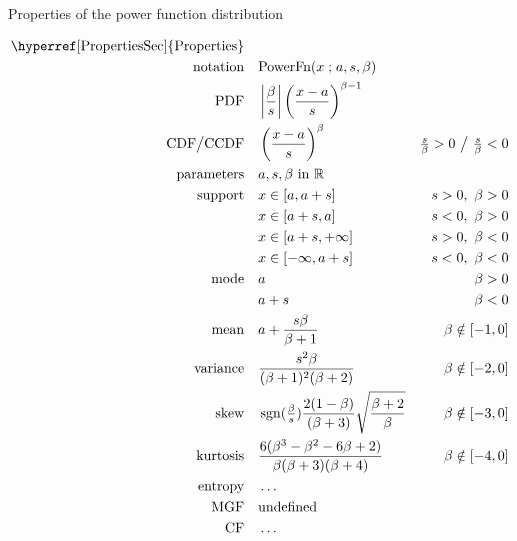 

\begin{table*}[t!]
\caption[Power function distribution -- Properties]{Properties of the power function distribution}
\begin{align*}
\text{\hyperref[PropertiesSec]{Properties}}  \quad& \\
\text{notation}\quad &   \text{PowerFn}(x\given a,s,\beta) 
\\
\text{PDF}\quad &   \left|\frac{\beta}{ s}\right|\left(\frac{x-a}{s} \right)^{\beta -1}  \checked
\\
 \text{CDF}  \big/ \text{CCDF} \quad  &   \left(\frac{x-a}{s} \right)^{\beta } & \tfrac{s}{\beta}  >0 \ \big{/} \ \tfrac{s}{\beta}<0  \checked
\\
\text{parameters}\quad &   a, s, \beta \text{ in } \Real
\\
\text{support} \quad &    x \in [a,a+s] & s>0,\ \beta >0 \checked
 \\ 			 &  x\in[a+s,a] &s<0,\ \beta >0   \checked
 \\  			 &  x\in[a+s,+\infty]& s>0,\ \beta<0 \checked
 \\  			&  x\in[-\infty,a+s] & s<0,\ \beta<0  \checked
\\
\text{mode} \quad  & a & \beta >0 \checked
\\
& a+s & \beta <0  \checked
\\
\text{mean} \quad  &a+  \frac{s\beta}{\beta+1} &  \beta \notin [-1,0] \checked
\\
\text{variance} \quad  & \frac{ s^2 \beta }{ (\beta+1)^2 (\beta+2) } & \beta \notin [-2,0] \checked
\\
\text{skew} \quad  & \op{sgn}(\tfrac{\beta}{s}) \frac{2(1-\beta)}{(\beta+3)}  \sqrt{\frac{\beta+2}{\beta}}
& \beta \notin [-3,0] 
\\
\text{kurtosis} \quad  &  \frac{6(\beta^3-\beta ^2- 6 \beta +2)}{\beta(\beta +3)(\beta +4)} & \beta \notin [-4,0] \checked
\\
\text{entropy} \quad  &  \ldots
\\
\text{MGF} \quad  &  \text{undefined}
\\
\text{CF} \quad  & \ldots
\end{align*}
\end{table*}
